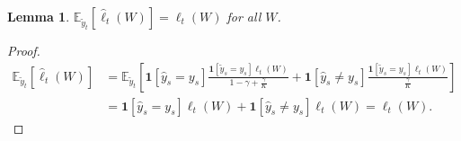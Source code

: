 \documentclass{article}
\newcommand{\one}{\boldsymbol{1}}
\newcommand{\field}[1]{\mathbb{#1}}
\newcommand{\E}{\field{E}}
\newtheorem{lemma}[theorem]{Lemma}
\DeclareMathOperator*{\argmax}{\arg\!\max}
\begin{document}



\begin{lemma}
$\E_{\tilde{y}_t}[\hat{\ell}_t(W)] = \ell_t(W)$ for all $W$. 
\end{lemma}
\begin{proof}
\begin{align*}
\E_{\tilde{y}_t}[\hat{\ell}_t(W)] &= \E_{\tilde{y}_t}\left[ \one[\hat{y}_s=y_s] \frac{\one[\tilde{y}_s=y_s]\ell_t(W)}{1-\gamma+\frac{\gamma}{K}}   +
\one[\hat{y}_s\neq y_s] \frac{\one[\tilde{y}_s = y_s]\ell_t(W)}{\frac{\gamma}{K}}\right] \\
& = \one[\hat{y}_s=y_s] \ell_t(W)   +
\one[\hat{y}_s\neq y_s] \ell_t(W) = \ell_t(W). 
\end{align*}
\end{proof}

\end{document}
